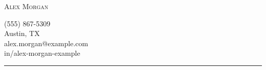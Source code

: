 \documentclass[11pt, letterpaper, roman]{letter}
\begin{document}
\pagestyle{empty}
\raggedbottom

\begin{minipage}[t]{0.5\textwidth}
    \vspace*{\fill}
    \textsc{{\Huge Alex Morgan}}
    \vspace*{\fill}
\end{minipage}\hfill
\begin{minipage}[t]{0.3\textwidth}
    \setlength{\baselineskip}{15pt}
    \RaggedLeft
    \faMobile{} (555) 867-5309\\
    \faHome{} Austin, TX\\
    \faEnvelope{} alex.morgan@example.com\\
    \faLinkedinSquare{} in/alex-morgan-example
\end{minipage}

{\color{cvteal} \rule{\linewidth}{1mm}}
\end{document}
